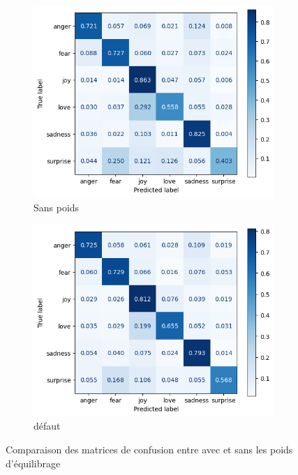 \documentclass{article}
\begin{document}
\begin{figure}[H]
    \centering
    \captionsetup{justification=centering}
    \begin{subfigure}{0.4\textwidth}
      \includegraphics[width=\textwidth]{img/jeu de test sans poids cm.png}
      \centering
      \caption{Sans poids }
    \end{subfigure}
    \begin{subfigure}{0.4\textwidth}
      \includegraphics[width=\textwidth]{img/jeu de test defaut cm.png}
      \centering
      \caption{défaut}
    \end{subfigure}
    \caption{Comparaison des matrices de confusion entre avec et sans les poids d'équilibrage}
    \label{fig:cm_sans_poids}
\end{figure}
\end{document}
